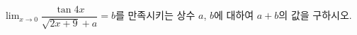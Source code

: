 $\displaystyle\lim_{x\to 0}\dfrac{\tan 4x}{\sqrt{2x+9}+a}=b$를 만족시키는 상수 $a$, $b$에 대하여 $a+b$의 값을 구하시오. 
